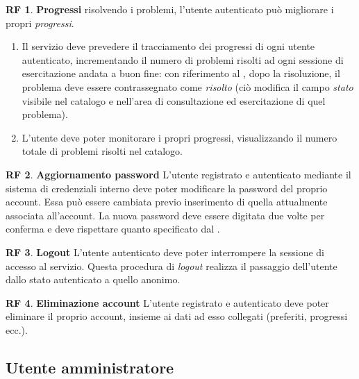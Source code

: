 \documentclass[11pt, a4paper]{article}
\theoremstyle{definition}
\newtheorem{funcreq}{RF} %
\begin{document}
\begin{funcreq}
\label{stats}
\textbf{Progressi } risolvendo i problemi, l'utente autenticato può migliorare
i propri \textit{progressi}.
\begin{enumerate}
    \item Il servizio deve prevedere il tracciamento dei progressi di ogni
    utente autenticato, incrementando il numero di problemi risolti ad ogni
    sessione di esercitazione andata a buon fine: con riferimento al
    \textcolor{blue}{},
    dopo la risoluzione, il problema deve essere contrassegnato come
    \textit{risolto} (ciò modifica il campo \textit{stato} visibile nel catalogo
    e nell'area di consultazione ed esercitazione di quel problema).

    \item L'utente deve poter monitorare i propri progressi, visualizzando il
    numero totale di problemi risolti nel catalogo.
\end{enumerate}
\end{funcreq}


\begin{funcreq}
\label{updateaccount}
\textbf{Aggiornamento password }
L'utente registrato e autenticato mediante il sistema di credenziali interno
deve poter modificare la password del proprio account. Essa può essere cambiata
previo inserimento di quella attualmente associata all'account. La nuova
password deve essere digitata due volte per conferma e deve rispettare quanto
specificato dal \textcolor{blue}{}.
\end{funcreq}
    
\begin{funcreq}
\label{logout}
\textbf{Logout }
L'utente autenticato deve poter interrompere la sessione di accesso
al servizio. Questa procedura di \textit{logout} realizza il passaggio dell'utente
dallo stato autenticato a quello anonimo.
\end{funcreq}

\begin{funcreq}
\textbf{Eliminazione account }
L'utente registrato e autenticato deve poter eliminare il proprio account,
insieme ai dati ad esso collegati (preferiti, progressi ecc.).
\end{funcreq}

\begin{center}
    \section*{Utente amministratore}
\end{center}
\end{document}

